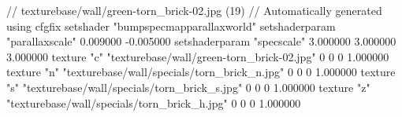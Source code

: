 // texturebase/wall/green-torn_brick-02.jpg (19)
// Automatically generated using cfgfix
setshader "bumpspecmapparallaxworld"
setshaderparam "parallaxscale" 0.009000 -0.005000
setshaderparam "specscale" 3.000000 3.000000 3.000000
texture "c" "texturebase/wall/green-torn_brick-02.jpg" 0 0 0 1.000000
texture "n" "texturebase/wall/specials/torn_brick_n.jpg" 0 0 0 1.000000
texture "s" "texturebase/wall/specials/torn_brick_s.jpg" 0 0 0 1.000000
texture "z" "texturebase/wall/specials/torn_brick_h.jpg" 0 0 0 1.000000
